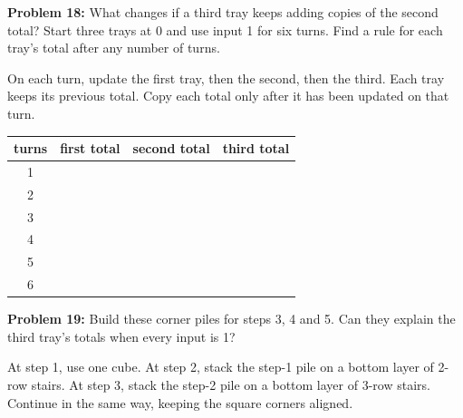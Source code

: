 \documentclass[12pt]{article}
\newcommand{\problem}[2]{\textbf{Problem #1:} #2\par}
\newcommand{\answer}[1]{\par\vspace{#1}\par}
\newcommand{\tray}[4]{\draw[rounded corners=3pt] (#1,#2) rectangle ++(1.65,1.15);\node at (#1+.825,#2+.63){\Large #4};\node[font=\small] at (#1+.825,#2-.25){#3};}
\begin{document}
\answer{55mm}

\newpage

\problem{18}{What changes if a third tray keeps adding copies of the second total? Start three trays at 0 and use input 1 for six turns. Find a rule for each tray's total after any number of turns.}

On each turn, update the first tray, then the second, then the third. Each tray keeps its previous total. Copy each total only after it has been updated on that turn.

\begin{center}\end{center}
\answer{15mm}
\begin{center}\renewcommand{\arraystretch}{2}
\begin{tabular}{c|ccc}
turns&first total&second total&third total\\\hline
1&&&\\
2&&&\\
3&&&\\
4&&&\\
5&&&\\
6&&&
\end{tabular}\end{center}

\newpage

\problem{19}{Build these corner piles for steps 3, 4 and 5. Can they explain the third tray's totals when every input is 1?}

At step 1, use one cube. At step 2, stack the step-1 pile on a bottom layer of 2-row stairs. At step 3, stack the step-2 pile on a bottom layer of 3-row stairs. Continue in the same way, keeping the square corners aligned.
\end{document}
